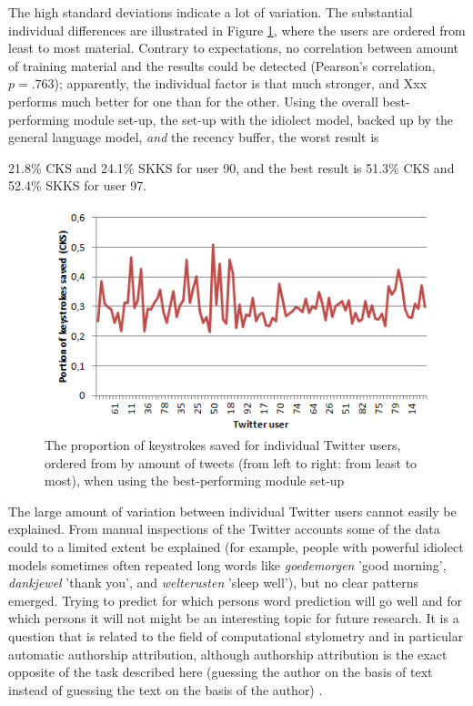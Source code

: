 \documentclass[11pt]{article}
\begin{document}
The high standard deviations indicate a lot of variation. The substantial individual differences are illustrated in Figure \ref{chaos}, where the users are ordered from least to most material. Contrary to expectations, no correlation between amount of training material and the results could be detected (Pearson's correlation, $p = .763$); apparently, the individual factor is that much stronger, and Xxx performs much better for one than for the other. Using the overall best-performing module set-up, the set-up with the idiolect model, backed up by the general language model, \emph{and} the recency buffer, the worst result is {21.8\% CKS and 24.1\% SKKS for user 90, and the best result is 51.3\% CKS and 52.4\% SKKS for user 97.

\begin{figure}[htb] \centering
\includegraphics[scale=0.6]{twitter_chaos}
\caption{The proportion of keystrokes saved for individual Twitter users, ordered from by amount of tweets (from left to right: from least to most), when using the best-performing module set-up}
\label{chaos}
\end{figure} 


The large amount of variation between individual Twitter users cannot easily be explained. From manual inspections of the Twitter accounts some of the data could to a limited extent be explained (for example, people with powerful idiolect models sometimes often repeated long words like \emph{goedemorgen} 'good morning', \emph{dankjewel} 'thank you', and \emph{welterusten} 'sleep well'), but no clear patterns emerged. Trying to predict for which persons word prediction will go well and for which persons it will not might be an interesting topic for future research. It is a question that is related to the field of computational stylometry and in particular automatic authorship attribution, although authorship attribution is the exact opposite of the task described here (guessing the author on the basis of text instead of guessing the text on the basis of the author) \cite{bagavandas+08}.

}
\end{document}
